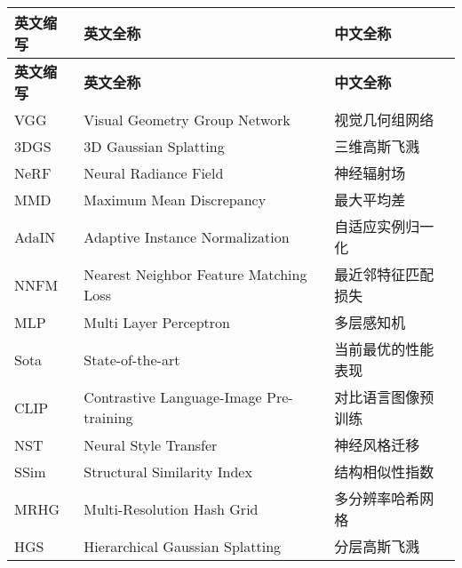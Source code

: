 \cleardoublepage
{}
\begin{center}
    \begin{longtable}{m{2cm}m{8cm}m{5cm}}
        \toprule
        \textbf{英文缩写}&\textbf{英文全称}&\textbf{中文全称}\\
        \midrule
        \endfirsthead
        \toprule
        \textbf{英文缩写}&\textbf{英文全称}&\textbf{中文全称}\\
        \midrule
        \endhead 
        \bottomrule
        \endfoot
        \bottomrule
        \endlastfoot
        VGG&Visual Geometry Group Network&视觉几何组网络\\
        3DGS&3D Gaussian Splatting&三维高斯飞溅\\
        NeRF&Neural Radiance Field&神经辐射场\\
        MMD&Maximum Mean Discrepancy&最大平均差\\
        AdaIN&Adaptive Instance Normalization&自适应实例归一化\\
        NNFM&Nearest Neighbor Feature Matching Loss&最近邻特征匹配损失\\
        MLP&Multi Layer Perceptron&多层感知机\\
        Sota&State-of-the-art&当前最优的性能表现\\
        CLIP&Contrastive Language-Image Pre-training&对比语言图像预训练\\
        NST&Neural Style Transfer&神经风格迁移\\
        SSim&Structural Similarity Index&结构相似性指数\\
        MRHG& Multi-Resolution Hash Grid & 多分辨率哈希网格\\
        HGS & Hierarchical Gaussian Splatting & 分层高斯飞溅\\
	\end{longtable}
\end{center}